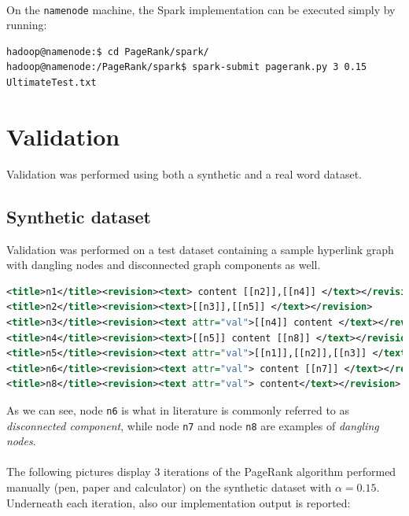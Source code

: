 \documentclass[11pt,a4paper]{article}
\begin{document}
\\
On the \texttt{namenode} machine, the Spark implementation can be executed simply by running:
\begin{lstlisting}[basicstyle=\scriptsize]
hadoop@namenode:$ cd PageRank/spark/
hadoop@namenode:/PageRank/spark$ spark-submit pagerank.py 3 0.15 UltimateTest.txt
\end{lstlisting}
\section{Validation}
Validation was performed using both a synthetic and a real word dataset.
\subsection{Synthetic dataset}
Validation was performed on a test dataset containing a sample hyperlink graph with  dangling nodes and disconnected graph components as well.
\begin{lstlisting}[language=xml,basicstyle=\scriptsize]
<title>n1</title><revision><text> content [[n2]],[[n4]] </text></revision>
<title>n2</title><revision><text>[[n3]],[[n5]] </text></revision>
<title>n3</title><revision><text attr="val">[[n4]] content </text></revision>
<title>n4</title><revision><text>[[n5]] content [[n8]] </text></revision>
<title>n5</title><revision><text attr="val">[[n1]],[[n2]],[[n3]] </text></revision>
<title>n6</title><revision><text attr="val"> content [[n7]] </text></revision>
<title>n8</title><revision><text attr="val"> content</text></revision>
\end{lstlisting}
As we can see, node \texttt{n6} is what in literature is commonly referred to as \textit{disconnected component}, while node \texttt{n7} and node \texttt{n8} are examples of \textit{dangling nodes}.\\
\\
The following pictures display $3$ iterations of the PageRank algorithm performed manually (pen, paper and calculator) on the synthetic dataset with $\alpha = 0.15$. Underneath each iteration, also our implementation output is reported:
\end{document}
